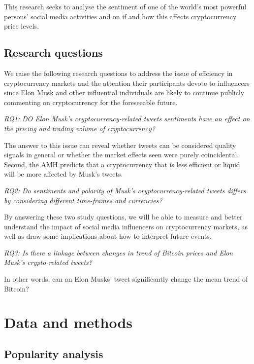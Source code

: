 \documentclass[
]{article}
\begin{document}
This research seeks to analyse the sentiment of one of the world's most
powerful persons' social media activities and on if and how this affects
cryptocurrency price levels.

\hypertarget{research-questions}{%
\subsection{Research questions}\label{research-questions}}

We raise the following research questions to address the issue of
effciency in cryptocurrency markets and the attention their participants
devote to influencers since Elon Musk and other influential individuals
are likely to continue publicly commenting on cryptocurrency for the
foreseeable future.

\emph{RQ1: DO Elon Musk's cryptocurrency-related tweets sentiments have
an effect on the pricing and trading volume of cryptocurrency?}

The answer to this issue can reveal whether tweets can be considered
quality signals in general or whether the market effects seen were
purely coincidental. Second, the AMH predicts that a cryptocurrency that
is less efficient or liquid will be more affected by Musk's tweets.

\emph{RQ2: Do sentiments and polarity of Musk's cryptocurrency-related
tweets differs by considering different time-frames and currencies?}

By answering these two study questions, we will be able to measure and
better understand the impact of social media influencers on
cryptocurrency markets, as well as draw some implications about how to
interpret future events.

\emph{RQ3: Is there a linkage between changes in trend of Bitcoin prices
and Elon Musk's crypto-related tweets?}

In other words, can an Elon Musks' tweet significantly change the mean
trend of Bitcoin?

\hypertarget{data-and-methods}{%
\section{Data and methods}\label{data-and-methods}}

\hypertarget{popularity-analysis}{%
\subsection{Popularity analysis}\label{popularity-analysis}}
\end{document}
